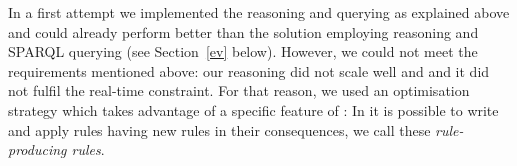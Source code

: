 In a first attempt we implemented the reasoning and querying as explained above and could already perform better than the solution employing \owl reasoning and SPARQL querying 
(see Section~\ref{ev} below). 
However, we could not meet the requirements mentioned above: our reasoning did not scale well and and it did not fulfil the real-time constraint. 
For that reason, we used an optimisation strategy 
which takes advantage of a specific feature of \nthree: 
In \nthree it is possible to write and apply rules having new rules in their consequences, we call these \emph{rule-producing rules}. 




